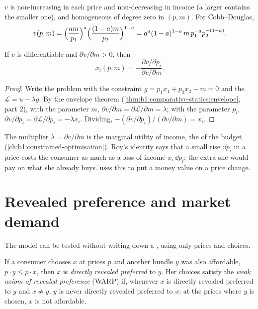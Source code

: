 $v$ is non-increasing in each price and non-decreasing in income (a larger
 contains the smaller one), and homogeneous of degree zero in
$(p, m)$. For Cobb--Douglas,
\[
v(p, m) = \Bigl(\frac{am}{p_1}\Bigr)^{a}\Bigl(\frac{(1 - a)m}{p_2}\Bigr)^{1-a} = a^a(1 - a)^{1-a}\,m\,p_1^{-a}p_2^{-(1-a)}.
\]

\begin{theorem}\label{thm:b1:consumer-choice:roy}
If $v$ is differentiable and $\partial v/\partial m > 0$, then
\[
x_i(p, m) = -\frac{\partial v/\partial p_i}{\partial v/\partial m}.
\]
\end{theorem}

\begin{proof}
Write the problem with the constraint $g = p_1x_1 + p_2x_2 - m = 0$ and the
 $\mathcal L = u - \lambda g$. By the envelope theorem
(\cref{thm:b1:comparative-statics:envelope}, part 2), with the parameter
$m$, $\partial v/\partial m = \partial\mathcal L/\partial m = \lambda$; with the
parameter $p_i$, $\partial v/\partial p_i = \partial\mathcal L/\partial p_i = -\lambda x_i$.
Dividing, $-(\partial v/\partial p_i)/(\partial v/\partial m) = x_i$.
\end{proof}

The multiplier $\lambda = \partial v/\partial m$ is the marginal utility of
income, the  of the budget (\cref{ch:b1:constrained-optimisation}).
Roy's identity says that a small rise $\dd p_i$ in a price costs the consumer
as much as a loss of income $x_i\,\dd p_i$: the extra she would pay on what
she already buys.  uses this to put a money
value on a price change.

\section{Revealed preference and market demand}\label{sec:b1:consumer-choice:revealed}

The model can be tested without writing down a , using
only prices and choices.

\begin{definition}\label{def:b1:consumer-choice:warp}
If a consumer chooses $x$ at prices $p$ and another bundle $y$ was also
affordable, $p\cdot y \le p\cdot x$, then $x$ is \emph{directly revealed preferred}
to $y$. Her choices satisfy the \emph{weak axiom of revealed preference}
(WARP) if, whenever $x$ is directly revealed preferred to $y$ and $x \neq y$, $y$
is never directly revealed preferred to $x$: at the prices where $y$ is
chosen, $x$ is not affordable.
\end{definition}


